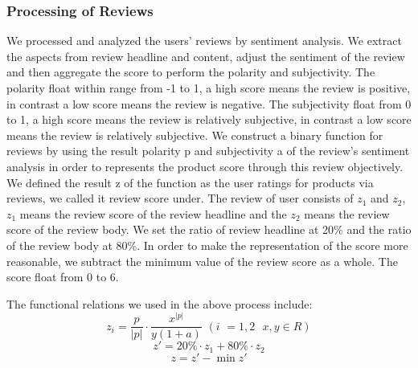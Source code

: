 \documentclass[12pt]{article}
\begin{document}
\subsubsection{Processing of Reviews}
\quad\par\par
We processed and analyzed the users' reviews by sentiment analysis. We extract the aspects from review headline and content, adjust the sentiment of the review and then aggregate the score to perform the polarity and subjectivity. The polarity float within range from -1 to 1, a high score means the review is positive, in contrast a low score means the review is negative. The subjectivity float from 0 to 1, a high score means the review is relatively subjective, in contrast a low score means the review is relatively subjective. We construct a binary function for reviews by using the result polarity p and subjectivity a of the review's sentiment analysis in order to represents the product score through this review objectively. We defined the result z of the function as the user ratings for products via reviews, we called it review score under. The review of user consists of $z_{1}$ and $z_{2}$, $z_{1}$ means the review score of the review headline and the $z_{2}$ means the review score of the review body. We set the ratio of review headline at 20\% and the ratio of the review body at 80\%. In order to make the representation of the score more reasonable, we subtract the minimum value of the review score as a whole. The score float from 0 to 6.
\par
The functional relations we used in the above process include:
$$z_i=\frac{p}{\left| p \right|}\cdot \frac{x^{\left| p \right|}}{y\left( 1+a \right)}\,\,\left(i\,\,=1,2 \,\,\,\,x,y\in R\right)$$
$$z'=20\%\cdot z_1+80\%\cdot z_2$$
$$z=z'-\min z'$$
\end{document}

